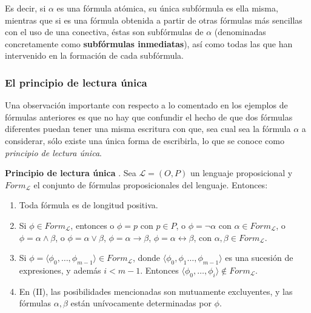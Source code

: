 Es decir, si $\alpha$ es una fórmula atómica, su única subfórmula es ella misma, mientras que si es una fórmula obtenida a partir de otras fórmulas más sencillas con el uso de una conectiva, éstas son subfórmulas de $\alpha$ (denominadas concretamente como \textbf{subfórmulas inmediatas}), así como todas las que han intervenido en la formación de cada subfórmula.

\subsubsection{El principio de lectura única}
Una observación importante con respecto a lo comentado en los ejemplos de fórmulas anteriores es que no hay que confundir el hecho de que dos fórmulas diferentes puedan tener una misma escritura con que, sea cual sea la fórmula $\alpha$ a considerar, sólo existe una única forma de escribirla, lo que se conoce como \textit{principio de lectura única}.

\begin{teorema}
    \textbf{Principio de lectura única} \cite[Capítulo 8]{monk1976mathematical}. Sea $\mathcal{L} = (O,P)$ un lenguaje proposicional y $Form_{\mathcal{L}}$ el conjunto de fórmulas proposicionales del lenguaje. Entonces:
    \begin{enumerate}[label=\Roman*.]
        \item Toda fórmula es de longitud positiva.
        \item Si $\phi \in Form_{\mathcal{L}}$, entonces o $\phi = p$ con $p \in P$, o $\phi = \neg \alpha$ con $\alpha \in Form_{\mathcal{L}}$, o $\phi = \alpha \land \beta$, o $\phi = \alpha \lor \beta$, $\phi = \alpha \rightarrow \beta$, $\phi = \alpha \leftrightarrow \beta$, con $\alpha,\beta \in Form_{\mathcal{L}}$.
        \item Si $\phi = \langle \phi_0,\ldots,\phi_{m-1} \rangle \in Form_{\mathcal{L}}$, donde $\langle \phi_0, \phi_1 \ldots, \phi_{m-1} \rangle$ es una sucesión de expresiones, y además $i < m-1$. Entonces $\langle \phi_0,\ldots,\phi_{i} \rangle \not \in Form_{\mathcal{L}}$.
        \item En (II), las posibilidades mencionadas son mutuamente excluyentes, y las fórmulas $\alpha,\beta$ están unívocamente determinadas por $\phi$.
    \end{enumerate}
\end{teorema}

